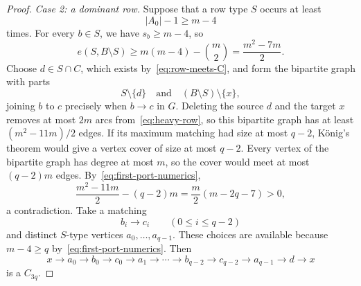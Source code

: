 \documentclass[11pt]{amsart}
\theoremstyle{definition}
\begin{document}
\begin{proof}
\smallskip
\noindent\emph{Case 2: a dominant row.}
Suppose that a row type $S$ occurs at least
\[
  |A_0|-1\ge m-4
\]
times.  For every $b\in S$, we have $s_b\ge m-4$, so
\begin{equation}\label{eq:heavy-row}
  e(S,B\setminus S)
  \ge m(m-4)-\binom m2
  =\frac{m^2-7m}{2}.
\end{equation}
Choose $d\in S\cap C$, which exists by~\eqref{eq:row-meets-C}, and
form the bipartite graph with parts
\[
  S\setminus\{d\}
  \quad\text{and}\quad
  (B\setminus S)\setminus\{x\},
\]
joining $b$ to $c$ precisely when $b\to c$ in $G$.  Deleting the
source $d$ and the target $x$ removes at most $2m$ arcs
from~\eqref{eq:heavy-row}, so this bipartite graph has at least
$(m^2-11m)/2$ edges.  If its maximum matching had size at most $q-2$,
K\"onig's theorem would give a vertex cover of size at most $q-2$.
Every vertex of the bipartite graph has degree at most $m$, so the cover
would meet at most $(q-2)m$ edges.  By~\eqref{eq:first-port-numerics},
\[
  \frac{m^2-11m}{2}-(q-2)m
  =\frac m2(m-2q-7)>0,
\]
a contradiction.  Take a matching
\[
  b_i\to c_i\qquad(0\le i\le q-2)
\]
and distinct $S$-type vertices $a_0,\ldots,a_{q-1}$.  These choices are
available because $m-4\ge q$ by~\eqref{eq:first-port-numerics}.  Then
\[
  x\to a_0\to b_0\to c_0\to a_1\to\cdots
  \to b_{q-2}\to c_{q-2}\to a_{q-1}\to d\to x
\]
is a $C_{3q}$.


\end{proof}
\end{document}
